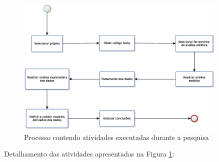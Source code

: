 \begin{figure}[h]
  \centering
  \includegraphics[width=0.9\textwidth]
      {figuras/metodologia_processo.eps}
  \caption{Processo contendo atividades executadas durante a pesquisa}
  \label{fig:processo}
\end{figure}

Detalhamento das atividades apresentadas na Figura \ref{fig:processo}:

